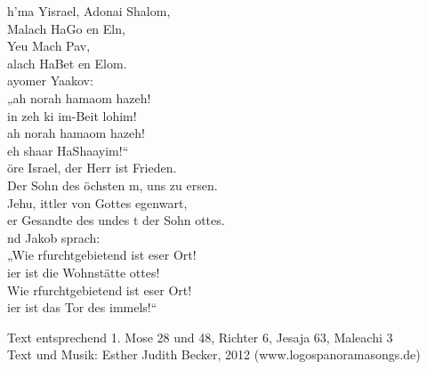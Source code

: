 
h'ma Yisrael, Adonai Shalom,\\
Malach HaGo en Eln,\\
Yeu Mach Pav,\\
alach HaBet en Elom.\\

ayomer Yaakov:\\
„ah norah hamaom hazeh!\\
in zeh ki im-Beit  lohim!\\
ah norah hamaom hazeh!\\
eh shaar HaShaayim!“\\

öre Israel, der Herr ist Frieden.\\
Der Sohn des öchsten m, uns zu ersen.\\
Jehu, ittler von Gottes egenwart,\\
er Gesandte des undes t der Sohn ottes.\\

nd Jakob sprach:\\
„Wie rfurchtgebietend ist eser Ort!\\
ier ist die Wohnstätte ottes!\\
Wie rfurchtgebietend ist eser Ort!\\
ier ist das Tor des immels!“\\

\begin{footnotesize}
Text entsprechend 1. Mose 28 und 48, Richter 6, Jesaja 63, Maleachi 3\\
Text und Musik: Esther Judith Becker, 2012 (www.logospanoramasongs.de)
\end{footnotesize}